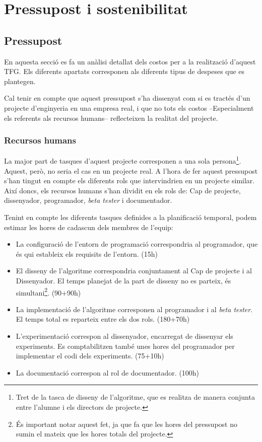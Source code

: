 \documentclass[10pt,a4paper]{article}
\begin{document}
\clearpage

\section{Pressupost i sostenibilitat}

\subsection{Pressupost}
\label{pressupost}

En aquesta secció es fa un anàlisi detallat dels costos per a la realització d'aquest TFG. Els diferents apartats corresponen als diferents tipus de despeses que es plantegen. 

Cal tenir en compte que aquest pressupost s'ha dissenyat com si es tractés d'un projecte d'enginyeria en una empresa real, i que no tots els costos --Especialment els referents als recursos humans-- reflecteixen la realitat del projecte.

\subsubsection{Recursos humans}

La major part de tasques d'aquest projecte corresponen a una sola persona\footnote{Tret de la tasca de disseny de l'algoritme, que es realitza de manera conjunta entre l'alumne i els directors de projecte.}. Aquest, però, no seria el cas en un projecte real. A l'hora de fer aquest pressupost s'han tingut en compte els diferents rols que intervindrien en un projecte similar. Així doncs, els recursos humans s'han dividit en els rols de: Cap de projecte, dissenyador, programador, \emph{beta tester} i documentador.

Tenint en compte les diferents tasques definides a la planificació temporal, podem estimar les hores de cadascun dels membres de l'equip:

\begin{itemize}
    \item La configuració de l'entorn de programació correspondria al programador, que és qui estableix els requisits de l'entorn. (15h)
    \item El disseny de l'algoritme correspondria conjuntament al Cap de projecte i al Dissenyador. El temps planejat de la part de disseny no es parteix, és simultani\footnote{És important notar aquest fet, ja que fa que les hores del pressupost no sumin el mateix que les hores totals del projecte.}. (90+90h)
    \item La implementació de l'algoritme corresponen al programador i al \emph{beta tester}. El temps total es reparteix entre els dos rols. (180+70h)
    \item L'experimentació correspon al dissenyador, encarregat de dissenyar els experiments. Es comptabilitzen també unes hores del programador per implementar el codi dels experiments. (75+10h)
    \item La documentació correspon al rol de documentador. (100h)
\end{itemize}
\end{document}
